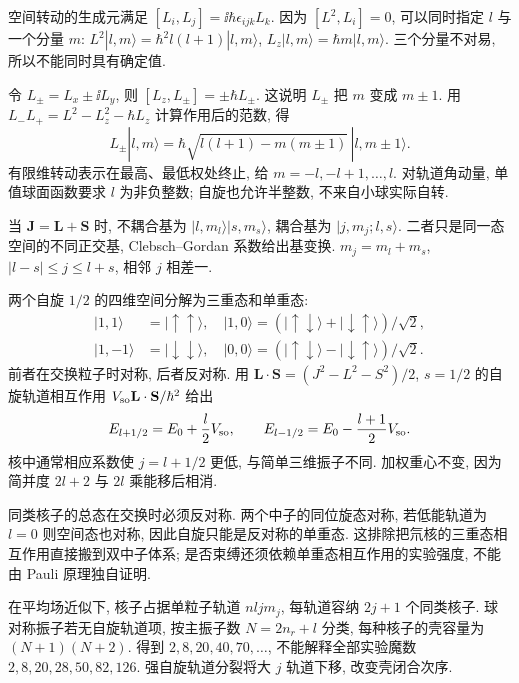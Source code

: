 \label{ch:angular}
空间转动的生成元满足 $[L_i,L_j]=\ii\hbar\epsilon_{ijk}L_k$. 因为 $[L^2,L_i]=0$, 可以同时指定 $l$ 与一个分量 $m$: $L^2|l,m\rangle=\hbar^2l(l+1)|l,m\rangle$, $L_z|l,m\rangle=\hbar m|l,m\rangle$. 三个分量不对易, 所以不能同时具有确定值.

令 $L_\pm=L_x\pm\ii L_y$, 则 $[L_z,L_\pm]=\pm\hbar L_\pm$. 这说明 $L_\pm$ 把 $m$ 变成 $m\pm1$. 用 $L_-L_+=L^2-L_z^2-\hbar L_z$ 计算作用后的范数, 得
\begin{equation}
 L_\pm|l,m\rangle=\hbar\sqrt{l(l+1)-m(m\pm1)}\,|l,m\pm1\rangle.
\end{equation}
有限维转动表示在最高、最低权处终止, 给 $m=-l,-l+1,\ldots,l$. 对轨道角动量, 单值球面函数要求 $l$ 为非负整数; 自旋也允许半整数, 不来自小球实际自转.

当 $\mathbf J=\mathbf L+\mathbf S$ 时, 不耦合基为 $|l,m_l\rangle|s,m_s\rangle$, 耦合基为 $|j,m_j;l,s\rangle$. 二者只是同一态空间的不同正交基, Clebsch--Gordan 系数给出基变换. $m_j=m_l+m_s$, $|l-s|\le j\le l+s$, 相邻 $j$ 相差一.

两个自旋 $1/2$ 的四维空间分解为三重态和单重态:
\begin{align*}
 |1,1\rangle&=|\uparrow\uparrow\rangle,\quad |1,0\rangle=(|\uparrow\downarrow\rangle+|\downarrow\uparrow\rangle)/\sqrt2,\\
 |1,-1\rangle&=|\downarrow\downarrow\rangle,\quad |0,0\rangle=(|\uparrow\downarrow\rangle-|\downarrow\uparrow\rangle)/\sqrt2.
\end{align*}
前者在交换粒子时对称, 后者反对称. 用 $\mathbf L\cdot\mathbf S=(J^2-L^2-S^2)/2$, $s=1/2$ 的自旋轨道相互作用 $V_{\rm so}\mathbf L\cdot\mathbf S/\hbar^2$ 给出
\begin{equation}
 E_{l+1/2}=E_0+\frac l2V_{\rm so},\qquad E_{l-1/2}=E_0-\frac{l+1}{2}V_{\rm so}.
\end{equation}
核中通常相应系数使 $j=l+1/2$ 更低, 与简单三维振子不同. 加权重心不变, 因为简并度 $2l+2$ 与 $2l$ 乘能移后相消.

同类核子的总态在交换时必须反对称. 两个中子的同位旋态对称, 若低能轨道为 $l=0$ 则空间态也对称, 因此自旋只能是反对称的单重态. 这排除把氘核的三重态相互作用直接搬到双中子体系; 是否束缚还须依赖单重态相互作用的实验强度, 不能由 Pauli 原理独自证明.

在平均场近似下, 核子占据单粒子轨道 $nljm_j$, 每轨道容纳 $2j+1$ 个同类核子. 球对称振子若无自旋轨道项, 按主振子数 $N=2n_r+l$ 分类, 每种核子的壳容量为 $(N+1)(N+2)$. 得到 $2,8,20,40,70,\ldots$, 不能解释全部实验魔数 $2,8,20,28,50,82,126$. 强自旋轨道分裂将大 $j$ 轨道下移, 改变壳闭合次序.

